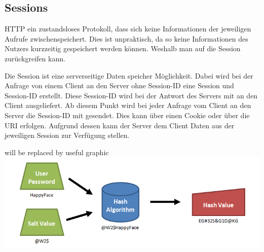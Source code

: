 \documentclass[11pt]{article}
\begin{document}
		\subsection{Sessions}
		\label{sec: sessions}
		
		\begin{flushleft}
			HTTP ein zustandsloses Protokoll, dass sich keine Informationen der jeweiligen Aufrufe zwischenspeichert. Dies ist unpraktisch, da so keine Informationen des Nutzers kurzzeitig gespeichert werden können. Weshalb man auf die Session zurückgreifen kann. \par\bigskip
		
		
			Die Session ist eine serverseitige Daten speicher Möglichkeit. Dabei wird bei der Anfrage von einem Client an den Server ohne Session-ID eine Session und Session-ID erstellt. Diese Session-ID wird bei der Antwort des Servers mit an den Client ausgeliefert. Ab diesem Punkt wird bei jeder Anfrage vom Client an den Server die Session-ID mit gesendet. Dies kann über einen Cookie oder über die URI erfolgen. Aufgrund dessen kann der Server dem Client Daten aus der jeweiligen Session zur Verfügung stellen. 
			
			\begin{center}
				will be replaced by useful graphic
				\includegraphics[scale=0.4]{salted_hash.png}
			\end{center}
			
		\end{flushleft}
		
\end{document}
